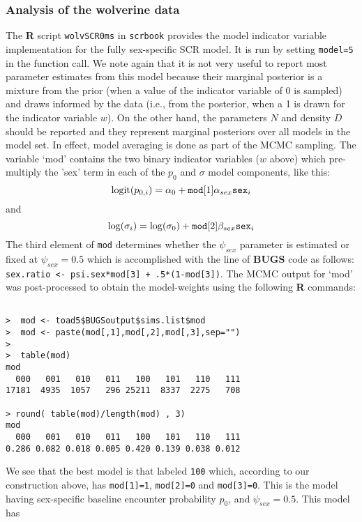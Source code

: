 \subsubsection{Analysis of the wolverine data}

The {\bf R} script \mbox{\tt wolvSCR0ms} in \mbox{\tt scrbook}
provides the model indicator variable implementation for the fully
sex-specific SCR model.  It is run by setting \mbox{\tt model=5} in
the function call. We note again that it is not very useful to report most
parameter estimates from this model because their marginal posterior
is a mixture from the prior (when a value of the indicator variable of
0 is sampled) and draws informed by the data (i.e., from the
posterior, when a 1 is drawn for the indicator variable $w$).
 On the other hand, the parameters
$N$ and density $D$ should be reported and they represent marginal
posteriors over all models in the model set. In effect, model
averaging is done as part of the MCMC sampling.  The variable `mod'
contains the two binary indicator variables ($w$ above) which
pre-multiply the 'sex' term in each of the $p_{0}$ and $\sigma$ model
components, like this:
\[
 \mbox{logit}(p_{0,i}) = \alpha_{0} + \mbox{\tt mod}[1] \alpha_{sex} \mbox{\tt sex}_{i}
\]
and
\[
 \mbox{log}(\sigma_{i}) = \log(\sigma_{0}) + \mbox{\tt mod}[2] \beta_{sex} \mbox{\tt sex}_{i}
\]
The third element of \mbox{\tt mod} determines whether the
$\psi_{sex}$ parameter is estimated or fixed at $\psi_{sex} =
0.5$ which is accomplished with the line of {\bf BUGS} code as
follows:
\newline 
\mbox{\tt sex.ratio <- psi.sex*mod[3] + .5*(1-mod[3])}.
The MCMC output for `mod' was post-processed to obtain the
model-weights using the following  {\bf R} commands:
\begin{verbatim}

>  mod <- toad5$BUGSoutput$sims.list$mod
>  mod <- paste(mod[,1],mod[,2],mod[,3],sep="")
>
>  table(mod)
mod
  000   001   010   011   100   101   110   111
17181  4935  1057   296 25211  8337  2275   708

> round( table(mod)/length(mod) , 3)
mod
  000   001   010   011   100   101   110   111
0.286 0.082 0.018 0.005 0.420 0.139 0.038 0.012

\end{verbatim}
We see that the best model is that labeled \mbox{\tt 100} which,
according to our construction above, has \mbox{\tt mod[1]=1},
\mbox{\tt mod[2]=0} and \mbox{\tt mod[3]=0}. This is the model 
having sex-specific baseline
encounter probability $p_{0}$, and $\psi_{sex} = 0.5$. This model has 
